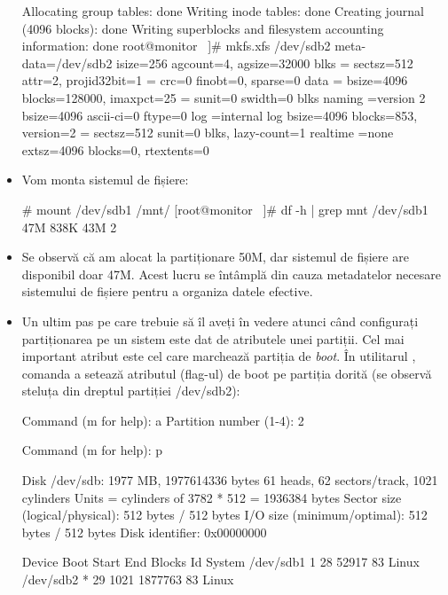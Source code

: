 \begin{itemize}
\begin{screen}
Allocating group tables: done
Writing inode tables: done
Creating journal (4096 blocks): done
Writing superblocks and filesystem accounting information:
done
root@monitor ~]# mkfs.xfs /dev/sdb2
meta-data=/dev/sdb2              isize=256    agcount=4, agsize=32000 blks
         =                       sectsz=512   attr=2, projid32bit=1
         =                       crc=0        finobt=0, sparse=0
data     =                       bsize=4096   blocks=128000, imaxpct=25
         =                       sunit=0      swidth=0 blks
naming   =version 2              bsize=4096   ascii-ci=0 ftype=0
log      =internal log           bsize=4096   blocks=853, version=2
         =                       sectsz=512   sunit=0 blks, lazy-count=1
realtime =none                   extsz=4096   blocks=0, rtextents=0
\end{screen}

	\item Vom monta sistemul de fișiere:

\begin{screen}
# mount /dev/sdb1 /mnt/
[root@monitor ~]# df -h | grep mnt
/dev/sdb1        47M  838K   43M   2%
\end{screen}

	\item Se observă că am alocat la partiționare 50M, dar sistemul de
		fișiere are disponibil doar 47M. Acest lucru se întâmplă din
		cauza metadatelor necesare sistemului de fișiere pentru a
		organiza datele efective.
	\item Un ultim pas pe care trebuie să îl aveți în vedere atunci când
		configurați partiționarea pe un sistem este dat de atributele
		unei partiții. Cel mai important atribut este cel care marchează
		partiția de \textit{boot}. În utilitarul , comanda a
		setează atributul (flag-ul) de boot pe partiția dorită (se
		observă steluța din dreptul partiției /dev/sdb2):

\begin{screen}
Command (m for help): a
Partition number (1-4): 2


Command (m for help): p


Disk /dev/sdb: 1977 MB, 1977614336 bytes
61 heads, 62 sectors/track, 1021 cylinders
Units = cylinders of 3782 * 512 = 1936384 bytes
Sector size (logical/physical): 512 bytes / 512 bytes
I/O size (minimum/optimal): 512 bytes / 512 bytes
Disk identifier: 0x00000000


   Device Boot      Start         End      Blocks   Id  System
/dev/sdb1               1          28       52917   83  Linux
/dev/sdb2   *          29        1021     1877763   83  Linux
\end{screen}

\end{itemize}

